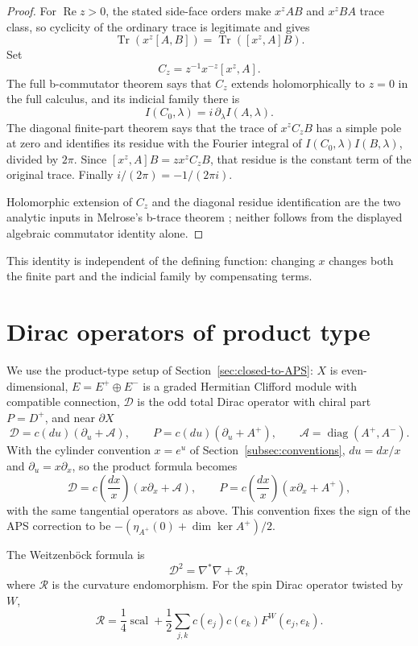 \documentclass[12pt,oneside,reqno]{article}
\DeclareMathOperator{\Tr}{Tr}
\theoremstyle{plain}
\theoremstyle{definition}
\theoremstyle{remark}
\begin{document}
\begin{proof}
For \(\operatorname{Re}z>0\), the stated side-face orders make
\(x^zAB\) and \(x^zBA\) trace class, so cyclicity of the ordinary trace is
legitimate and gives
\[
 \Tr(x^z[A,B])=\Tr([x^z,A]B).
\]
Set
\[
 C_z=z^{-1}x^{-z}[x^z,A].
\]
The full b-commutator theorem says that \(C_z\) extends holomorphically to
\(z=0\) in the full calculus, and its indicial family there is
\[
 I(C_0,\lambda)=i\,\partial_\lambda I(A,\lambda).
\]
The diagonal finite-part theorem says that the trace of \(x^zC_zB\) has a
simple pole at zero and identifies its residue with the Fourier integral of
\(I(C_0,\lambda)I(B,\lambda)\), divided by \(2\pi\).
Since \([x^z,A]B=z x^zC_zB\), that residue is the constant term of the
original trace. Finally \(i/(2\pi)=-1/(2\pi i)\).

Holomorphic extension of \(C_z\) and the diagonal residue identification
are the two analytic inputs in Melrose's b-trace theorem
\cite[Chapter~5]{Melrose}; neither follows from the displayed algebraic
commutator identity alone.
\end{proof}

This identity is independent of the defining function: changing \(x\)
changes both the finite part and the indicial family by compensating terms.

\section{Dirac operators of product type}

We use the product-type setup of Section~\ref{sec:closed-to-APS}:
\(X\) is even-dimensional, \(E=E^+\oplus E^-\) is a graded Hermitian
Clifford module with compatible connection, \(\mathcal D\) is the odd
total Dirac operator with chiral part \(P=D^+\), and near \(\partial X\)
\[
 \mathcal D=c(du)(\partial_u+\mathcal A),
 \qquad
 P=c(du)(\partial_u+A^+),
 \qquad
 \mathcal A=\operatorname{diag}(A^+,A^-).
\]
With the cylinder convention \(x=e^u\) of
Section~\ref{subsec:conventions}, \(du=dx/x\) and
\(\partial_u=x\partial_x\), so the product formula becomes
\[
 \mathcal D=c\!\left(\frac{dx}{x}\right)(x\partial_x+\mathcal A),
 \qquad
 P=c\!\left(\frac{dx}{x}\right)(x\partial_x+A^+),
\]
with the same tangential operators as above. This convention fixes the sign
of the APS correction to be
\(-(\eta_{A^+}(0)+\dim\ker A^+)/2\).

The Weitzenböck formula is
\[
 \mathcal D^2=\nabla^*\nabla+\mathcal R,
\]
where \(\mathcal R\) is the curvature endomorphism. For the spin Dirac
operator twisted by \(W\),
\[
 \mathcal R=\frac14\operatorname{scal}
 +\frac12\sum_{j,k}c(e_j)c(e_k)F^W(e_j,e_k).
\]
\end{document}
